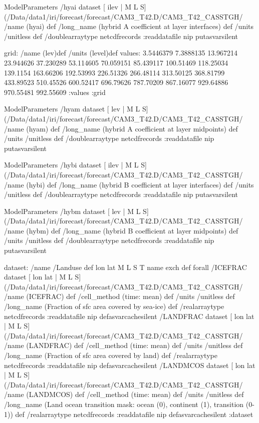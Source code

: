 \begin{ingrid}
ModelParameters  /hyai{
dataset
[ ilev | M L S] (/Data/data1/iri/forecast/forecast/CAM3_T42.D/CAM3_T42_CASSTGH/%
/name (hyai) def
 /long_name (hybrid A coefficient at layer interfaces) def
 /units /unitless def
 /doublearraytype netcdfrecords :readdatafile
nip
}putasvarsilent


grid:
/name (lev)def
/units (level)def
values: 3.5446379 7.3888135 13.967214 23.944626 37.230289 53.114605 70.059151 85.439117 100.51469 118.25034 139.1154 163.66206 192.53993 226.51326 266.48114 313.50125 368.81799 433.89523 510.45526 600.52417 696.79626 787.70209 867.16077 929.64886 970.55481 992.55609 :values
:grid

ModelParameters /hyam{
dataset
[ lev | M L S] (/Data/data1/iri/forecast/forecast/CAM3_T42.D/CAM3_T42_CASSTGH/%
/name (hyam) def
 /long_name (hybrid A coefficient at layer midpoints) def
 /units /unitless def
 /doublearraytype netcdfrecords :readdatafile
nip
}putasvarsilent

ModelParameters /hybi{
dataset
[ ilev | M L S] (/Data/data1/iri/forecast/forecast/CAM3_T42.D/CAM3_T42_CASSTGH/%
/name (hybi) def
 /long_name (hybrid B coefficient at layer interfaces) def
 /units /unitless def
 /doublearraytype netcdfrecords :readdatafile
nip
}putasvarsilent

ModelParameters /hybm{
dataset
[ lev | M L S] (/Data/data1/iri/forecast/forecast/CAM3_T42.D/CAM3_T42_CASSTGH/%
/name (hybm) def
 /long_name (hybrid B coefficient at layer midpoints) def
 /units /unitless def
 /doublearraytype netcdfrecords :readdatafile
nip
}putasvarsilent


dataset: /name /Landuse def
{ lon lat M L S T } { name exch def } forall
 /ICEFRAC{
dataset
[ lon lat | M L S] (/Data/data1/iri/forecast/forecast/CAM3_T42.D/CAM3_T42_CASSTGH/%
/name (ICEFRAC) def
 /cell_method (time: mean) def
 /units /unitless def
 /long_name (Fraction of sfc area covered by sea-ice) def
 /realarraytype netcdfrecords :readdatafile
nip
}defasvarcachesilent
 /LANDFRAC{
dataset
[ lon lat | M L S] (/Data/data1/iri/forecast/forecast/CAM3_T42.D/CAM3_T42_CASSTGH/%
/name (LANDFRAC) def
 /cell_method (time: mean) def
 /units /unitless def
 /long_name (Fraction of sfc area covered by land) def
 /realarraytype netcdfrecords :readdatafile
nip
}defasvarcachesilent
 /LANDMCOS{
dataset
[ lon lat | M L S] (/Data/data1/iri/forecast/forecast/CAM3_T42.D/CAM3_T42_CASSTGH/%
/name (LANDMCOS) def
 /cell_method (time: mean) def
 /units /unitless def
 /long_name (Land ocean transition mask: ocean (0), continent (1), transition (0-1)) def
 /realarraytype netcdfrecords :readdatafile
nip
}defasvarcachesilent
:dataset


\end{ingrid}
